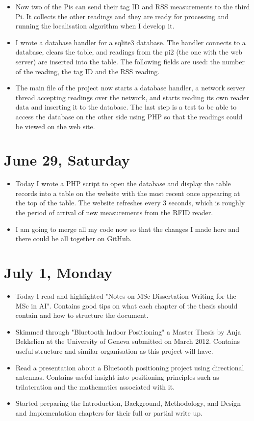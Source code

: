 \documentclass[a4paper,12pt]{article}
\begin{document}
\begin{itemize}
	\item Now two of the Pis can send their tag ID and RSS measurements to the third Pi. It collects the other readings and they are ready for processing and running the localisation algorithm when I develop it.
	\item I wrote a database handler for a sqlite3 database. The handler connects to a database, clears the table, and readings from the pi2 (the one with the web server) are inserted into the table. The following fields are used: the number of the reading, the tag ID and the RSS reading.
	\item The main file of the project now starts a database handler, a network server thread accepting readings over the network, and starts reading its own reader data and inserting it to the database. The last step is a test to be able to access the database on the other side using PHP so that the readings could be viewed on the web site.
\end{itemize}

\section{June 29, Saturday}

\begin{itemize}
	\item Today I wrote a PHP script to open the database and display the table records into a table on the website with the most recent once appearing at the top of the table. The website refreshes every 3 seconds, which is roughly the period of arrival of new measurements from the RFID reader.
	\item I am going to merge all my code now so that the changes I made here and there could be all together on GitHub.
\end{itemize}

\section{July 1, Monday}

\begin{itemize}
	\item Today I read and highlighted "Notes on MSc Dissertation Writing for the MSc in AI". Contains good tips on what each chapter of the thesis should contain and how to structure the document.
	\item Skimmed through "Bluetooth Indoor Positioning" a Master Thesis by Anja Bekkelien at the University of Geneva submitted on March 2012. Contains useful structure and similar organisation as this project will have.
	\item Read a presentation about a Bluetooth positioning project using directional antennas. Contains useful insight into positioning principles such as trilateration and the mathematics associated with it.
	\item Started preparing the Introduction, Background, Methodology, and Design and Implementation chapters for their full or partial write up.
\end{itemize}
\end{document}
